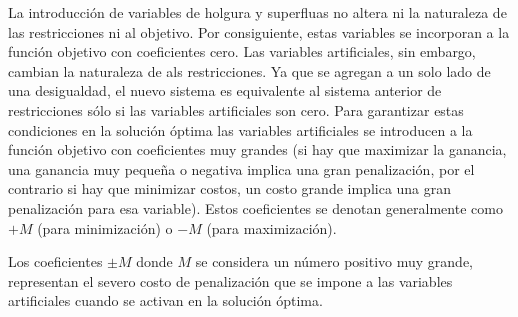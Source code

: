 La introducción de variables de holgura y superfluas no altera ni la naturaleza de las restricciones ni al objetivo. Por consiguiente, estas variables se incorporan a la función objetivo con coeficientes cero. Las variables artificiales, sin embargo, cambian la naturaleza de als restricciones. Ya que se agregan a un solo lado de una desigualdad, el nuevo sistema es equivalente al sistema anterior de restricciones sólo si las variables artificiales son cero. Para garantizar estas condiciones en la solución óptima las variables artificiales se introducen a la función objetivo con coeficientes muy grandes (si hay que maximizar la ganancia, una ganancia muy pequeña o negativa implica una gran penalización, por el contrario si hay que minimizar costos, un costo grande implica una gran penalización para esa variable). Estos coeficientes se denotan generalmente como \(+M\) (para minimización) o \(-M\) (para maximización).

Los coeficientes \(\pm M\) donde \(M\) se considera un número positivo muy grande, representan el severo costo de penalización que se impone a las variables artificiales cuando se activan en la solución óptima. 